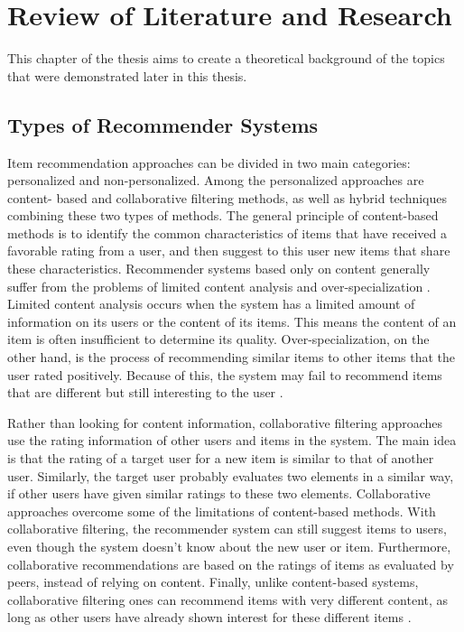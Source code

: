 
\chapter{Review of Literature and Research}\label{chapter:review_of_research}

This chapter of the thesis aims to create a theoretical background of the topics that were demonstrated later in this thesis.

\section{Types of Recommender Systems}

Item recommendation approaches can be divided in two main categories: personalized and non-personalized. Among the personalized approaches are content- based and collaborative filtering methods, as well as hybrid techniques combining these two types of methods. The general principle of content-based methods is to identify the common characteristics of items that have received a favorable rating from a user, and then suggest to this user new items that share these characteristics. Recommender systems based only on content generally suffer from the problems of limited content analysis and over-specialization \cite{shardanand1995social}. Limited content analysis occurs when the system has a limited amount of information on its users or the content of its items. This means the content of an item is often insufficient to determine its quality. Over-specialization, on the other hand, is the process of recommending similar items to other items that the user rated positively. Because of this, the system may fail to recommend items that are different but still interesting to the user \cite{desrosiers2011comprehensive}.


Rather than looking for content information, collaborative filtering approaches use the rating information of other users and items in the system. The main idea is that the rating of a target user for a new item is similar to that of another user. Similarly, the target user probably evaluates two elements in a similar way, if other users have given similar ratings to these two elements. Collaborative approaches overcome some of the limitations of content-based methods. With collaborative filtering, the recommender system can still suggest items to users, even though the system doesn't know about the new user or item. Furthermore, collaborative recommendations are based on the ratings of items as evaluated by peers, instead of relying on content. Finally, unlike content-based systems, collaborative filtering ones can recommend items with very different content, as long as other users have already shown interest for these different items \cite{desrosiers2011comprehensive}.

